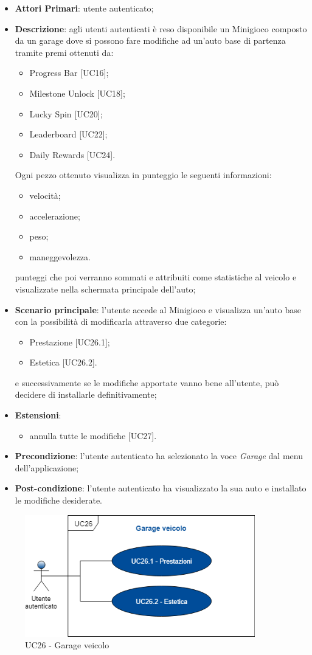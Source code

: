 \begin{itemize}
	\item \textbf{Attori Primari}: utente autenticato;
	\item \textbf{Descrizione}: agli utenti autenticati è reso disponibile un Minigioco composto da un garage dove si possono fare modifiche ad un'auto base di partenza tramite premi ottenuti da:
	\begin{itemize}
		\item Progress Bar [UC16];
		\item Milestone Unlock [UC18];
		\item Lucky Spin [UC20];
		\item Leaderboard [UC22];
		\item Daily Rewards [UC24]. 
	\end{itemize} 
	Ogni pezzo ottenuto visualizza in punteggio le seguenti informazioni:
	\begin{itemize}
		\item velocità;
		\item accelerazione;
		\item peso;
		\item maneggevolezza.
	\end{itemize}
	punteggi che poi verranno sommati e attribuiti come statistiche al veicolo e visualizzate nella schermata principale dell'auto; 
	\item \textbf{Scenario principale}: l'utente accede al Minigioco e visualizza un'auto base con la possibilità di modificarla attraverso due categorie:
	\begin{itemize}
		\item Prestazione [UC26.1];
		\item Estetica [UC26.2].
	\end{itemize}
	e successivamente se le modifiche apportate vanno bene all'utente, può decidere di installarle definitivamente;
	\item \textbf{Estensioni}:
	\begin{itemize}
		\item annulla tutte le modifiche [UC27].
	\end{itemize}
	\item \textbf{Precondizione}: l'utente autenticato ha selezionato la voce \textit{Garage} dal menu dell'applicazione;
	\item \textbf{Post-condizione}: l'utente autenticato ha visualizzato la sua auto e installato le modifiche desiderate. 
\end{itemize}
\begin{figure}[h]
	\includegraphics[width=10cm]{res/images/UC26-Garage.png}
	\centering
	\caption{UC26 - Garage veicolo}
\end{figure}
